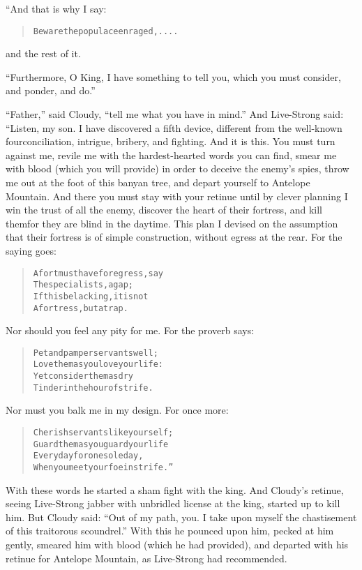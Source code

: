 \documentclass[article, twoside, 14pt]{memoir}
\renewenvironment{verbatim}{%
\begin{quote}%
\vskip -10pt%
\begin{alltt}\normalfont\large}{\end{alltt}%
\end{quote}%
\vskip -10pt
} %
\begin{document}
“And that is why I say:

\begin{verbatim}
Beware the populace enraged, ....
\end{verbatim}
and the rest of it.

``Furthermore, O King, I have something to tell you, which you must consider, and ponder, and do.''

``Father,'' said Cloudy, ``tell me what you have in mind.'' And
Live-Strong said: “Listen, my son. I have discovered a fifth
device, different from the well-known four{\textemdash}conciliation,
intrigue, bribery, and fighting. And it is this. You must turn
against me, revile me with the hardest-hearted words you can find,
smear me with blood (which you will provide) in order to deceive
the enemy's spies, throw me out at the foot of this banyan tree,
and depart yourself to Antelope Mountain. And there you must stay
with your retinue until by clever planning I win the trust of all
the enemy, discover the heart of their fortress, and kill
them{\textemdash}for they are blind in the daytime. This plan I devised on
the assumption that their fortress is of simple construction,
without egress at the rear. For the saying goes:

\begin{verbatim}
A fort must have for egress, say
    The specialists, a gap;
If this be lacking, it is not
    A fortress, but a trap.
\end{verbatim}
Nor should you feel any pity for me. For the proverb says:

\begin{verbatim}
Pet and pamper servants well;
    Love them as you love your life:
Yet consider them as dry
    Tinder in the hour of strife.
\end{verbatim}
Nor must you balk me in my design. For once more:

\begin{verbatim}
Cherish servants like yourself;
    Guard them as you guard your life
Every day for one sole day,
    When you meet your foe in strife.”
\end{verbatim}
With these words he started a sham fight with the king. And
Cloudy's retinue, seeing Live-Strong jabber with unbridled license
at the king, started up to kill him. But Cloudy said:
``Out of my path, you. I take upon myself the chastisement of this traitorous scoundrel.''
With this he pounced upon him, pecked at him gently, smeared him
with blood (which he had provided), and departed with his retinue
for Antelope Mountain, as Live-Strong had recommended.
\end{document}
